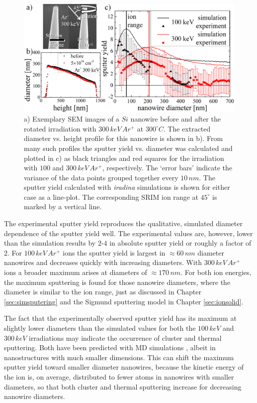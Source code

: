 \begin{figure}[th]
	\centering
		\includegraphics[width=.95\textwidth]{images/sputter_exp.png}
	\caption{a) Exemplary SEM images of a $Si$ nanowire before and after the rotated irradiation with $300\,keV\,Ar^+$ at $300^\circ C$. The extracted diameter vs. height profile for this nanowire is shown in b). From many such profiles the sputter yield vs. diameter was calculated and plotted in c) as black triangles and red squares for the irradiation with $100$ and $300\,keV\,Ar^+$, respectively. The `error bars' indicate the variance of the data points grouped together every $10\,nm$. The sputter yield calculated with \emph{iradina} simulations is shown for either case as a line-plot. The corresponding SRIM ion range at $45^\circ$ is marked by a vertical line.} 
	\label{sputtering_exp}
\end{figure} 

The experimental sputter yield reproduces the qualitative, simulated diameter dependence of the sputter yield well. The experimental values are, however, lower than the simulation results by $2$-$4$  in absolute sputter yield or roughly a factor of 2. For $100\,keV\,Ar^+$ ions the sputter yield is largest in $\approx 60\,nm$ diameter nanowires and decreases quickly with increasing diameters. With $300\,keV\,Ar^+$ ions a broader maximum arises at diameters of $\approx 170\,nm$. For both ion energies, the maximum sputtering is found for those nanowire diameters, where the diameter is similar to the ion range, just as discussed in Chapter \ref{sec:simsputering} and the Sigmund sputtering model in Chapter \ref{sec:ionsolid}.   

The fact that the experimentally observed sputter yield has its maximum at slightly lower diameters than the simulated values for both the $100\,keV$ and $300\,keV$ irradiations may indicate the occurrence of cluster and thermal sputtering. Both have been predicted with MD simulations \cite{nietiadi_sputtering_2014,urbassek_sputter_2015,anders_sputtering_2015}, albeit in nanostructures with much smaller dimensions. This can shift the maximum sputter yield toward smaller diameter nanowires, because the kinetic energy of the ion is, on average, distributed to fewer atoms in nanowires with smaller diameters, so that both cluster and thermal sputtering increase for decreasing nanowire diameters.

